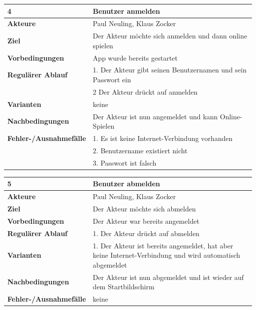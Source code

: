 \documentclass[fontsize=12pt,paper=a4,twoside]{scrartcl}
\begin{document}
\begin{table}
	[H] \label{4} 
	\begin{tabular}
		{|l|p{10cm}|} \hline \textbf{4} & \textbf{Benutzer anmelden} \\
		\hline \textbf{Akteure} & Paul Neuling, Klaus Zocker\\
		\hline \textbf{Ziel} & Der Akteur möchte sich anmelden und dann online spielen \\
		\hline \textbf{Vorbedingungen} & App wurde bereits gestartet \\
		\hline \textbf{Regulärer Ablauf} & 1. Der Akteur gibt seinen Benutzernamen und sein Passwort ein \\
		&2 Der Akteur drückt auf anmelden\\
		\hline \textbf{Varianten} & keine \\
		\hline \textbf{Nachbedingungen} & Der Akteur ist nun angemeldet und kann Online-Spielen\\
		\hline \textbf{Fehler-/Ausnahmefälle} & 1. Es ist keine Internet-Verbindung vorhanden \\
		&2. Benutzername existiert nicht\\
		&3. Passwort ist falsch\\
		\hline 
	\end{tabular}
\end{table}

\begin{table}
	[H] \label{5} 
	\begin{tabular}
		{|l|p{10cm}|} \hline \textbf{5} & \textbf{Benutzer abmelden} \\
		\hline \textbf{Akteure} & Paul Neuling, Klaus Zocker\\
		\hline \textbf{Ziel} & Der Akteur möchte sich abmelden\\
		\hline \textbf{Vorbedingungen} & Der Akteur war bereits angemeldet \\
		\hline \textbf{Regulärer Ablauf} & 1. Der Akteur drückt auf abmelden \\
		\hline \textbf{Varianten} & 1. Der Akteur ist bereits angemeldet, hat aber keine Internet-Verbindung und wird automatisch abgemeldet \\
		\hline \textbf{Nachbedingungen} & Der Akteur ist nun abgemeldet und ist wieder auf dem Startbildschirm\\
		\hline \textbf{Fehler-/Ausnahmefälle} & keine \\
		\hline 
	\end{tabular}
\end{table}
\end{document}
